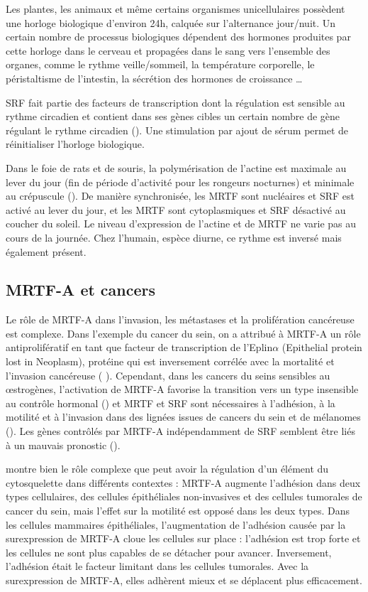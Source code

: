 \documentclass{report}
\begin{document}
Les plantes, les animaux et même certains organismes unicellulaires possèdent une horloge biologique d'environ 24h, calquée sur l'alternance jour/nuit. Un certain nombre de processus biologiques dépendent des hormones produites par cette horloge dans le cerveau et propagées dans le sang vers l'ensemble des organes, comme le rythme veille/sommeil, la température corporelle, le péristaltisme de l'intestin, la sécrétion des hormones de croissance \dots 

SRF fait partie des facteurs de transcription dont la régulation est sensible au rythme circadien et contient dans ses gènes cibles un certain nombre de gène régulant le rythme circadien (\cite{esnault_rho-actin_2014}). Une stimulation par ajout de sérum permet de réinitialiser l'horloge biologique.

Dans le foie de rats et de souris, la polymérisation de l'actine est maximale au lever du jour (fin de période d'activité pour les rongeurs nocturnes) et minimale au crépuscule (\cite{gerber_blood-borne_2013}). De manière synchronisée, les MRTF sont nucléaires et SRF est activé au lever du jour, et les MRTF sont cytoplasmiques et SRF désactivé au coucher du soleil. Le niveau d'expression de l'actine et de MRTF ne varie pas au cours de la journée. Chez l'humain, espèce diurne, ce rythme est inversé mais également présent. 



\subsection{MRTF-A et cancers}
Le rôle de MRTF-A dans l'invasion, les métastases et la prolifération cancéreuse est complexe. 
Dans l'exemple du cancer du sein, on a attribué à MRTF-A un rôle antiprolifératif en tant que facteur de transcription de l'Eplin$\alpha$ (Epithelial protein lost in Neoplasm), protéine qui est inversement corrélée avec la mortalité et l'invasion cancéreuse ( \cite{leitner_epithelial_2010}).
Cependant, dans les cancers du seins sensibles au \oe strogènes, l'activation de MRTF-A favorise la transition vers un type insensible au contrôle hormonal (\cite{kerdivel_activation_2014}) et MRTF et SRF sont nécessaires à l'adhésion, à la motilité et à l'invasion dans des lignées issues de cancers du sein et de mélanomes (\cite{medjkane_myocardin-related_2009}).  
Les gènes contrôlés par MRTF-A indépendamment de SRF semblent être liés à un mauvais pronostic (\cite{gurbuz_sap_2014}). 

\cite{leitner_mal/mrtf-controls_2011} montre bien le rôle complexe que peut avoir la régulation d'un élément du cytosquelette dans différents contextes : MRTF-A augmente l'adhésion dans deux types cellulaires, des cellules épithéliales non-invasives et des cellules tumorales de cancer du sein, mais l'effet sur la motilité est opposé dans les deux types. Dans les cellules mammaires épithéliales, l'augmentation de l'adhésion causée par la surexpression de MRTF-A cloue les cellules sur place : l'adhésion est trop forte et les cellules ne sont plus capables de se détacher pour avancer. Inversement, l'adhésion était le facteur limitant dans les cellules tumorales. Avec la surexpression de MRTF-A, elles adhèrent mieux et se déplacent plus efficacement. 
\end{document}
